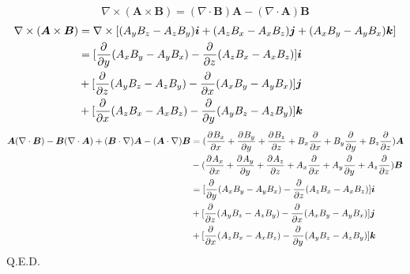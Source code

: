 \documentclass[UTF8,9pt]{ctexart}
\begin{document}
$$\nabla\times(\bm{A}\times\bm{B})=(\nabla\cdot\bm{B})\bm{A} - (\nabla\cdot\bm{A})\bm{B}$$
$$\ar{
    \nabla\times(\bm{A}\times\bm{B})&=\nabla \times [(A_yB_z-A_zB_y)\bm{i}+(A_zB_x-A_xB_z)\bm{j}+(A_xB_y-A_yB_x)\bm{k}]\\
    &=[\pp{}{y}(A_xB_y-A_yB_x)-\pp{}{z}(A_zB_x-A_xB_z)]\bm{i}\\
    &+[\pp{}{z}(A_yB_z-A_zB_y)-\pp{}{x}(A_xB_y-A_yB_x)]\bm{j}\\
    &+[\pp{}{x}(A_zB_x-A_xB_z)-\pp{}{y}(A_yB_z-A_zB_y)]\bm{k}
}$$
$$\ar{
    \bm{ A } ( \nabla \cdot \bm{ B } ) - \bm{ B } ( \nabla \cdot \bm{ A } ) + ( \bm{ B } \cdot \nabla ) \bm{ A } - ( \bm{ A } \cdot \nabla ) \bm{ B }
    &= (\pp{B_x}{x}+\pp{B_y}{y}+\pp{B_z}{z} + B_x\pp{}{x}+B_y\pp{}{y}+B_z\pp{}{z})\bm{A} \\
    &- (\pp{A_x}{x}+\pp{A_y}{y}+\pp{A_z}{z} + A_x\pp{}{x}+A_y\pp{}{y}+A_z\pp{}{z})\bm{B}\\
    &=[\pp{}{y}(A_xB_y-A_yB_x)-\pp{}{z}(A_zB_x-A_xB_z)]\bm{i}\\
    &+[\pp{}{z}(A_yB_z-A_zB_y)-\pp{}{x}(A_xB_y-A_yB_x)]\bm{j}\\
    &+[\pp{}{x}(A_zB_x-A_xB_z)-\pp{}{y}(A_yB_z-A_zB_y)]\bm{k}
}$$
Q.E.D.
\end{document}
